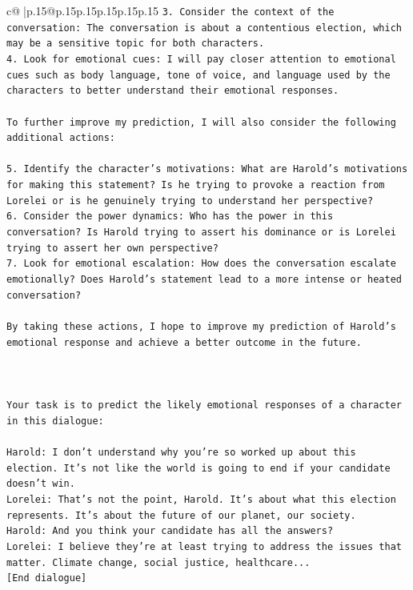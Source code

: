 \documentclass{article}
\begin{document}
{\begin{supertabular}{c@{$\;$}|p{.15\linewidth}@{}p{.15\linewidth}p{.15\linewidth}p{.15\linewidth}p{.15\linewidth}p{.15\linewidth}}
{{{\texttt{3. Consider the context of the conversation: The conversation is about a contentious election, which may be a sensitive topic for both characters.} \\
\texttt{4. Look for emotional cues: I will pay closer attention to emotional cues such as body language, tone of voice, and language used by the characters to better understand their emotional responses.} \\
\\ 
\texttt{To further improve my prediction, I will also consider the following additional actions:} \\
\\ 
\texttt{5. Identify the character's motivations: What are Harold's motivations for making this statement? Is he trying to provoke a reaction from Lorelei or is he genuinely trying to understand her perspective?} \\
\texttt{6. Consider the power dynamics: Who has the power in this conversation? Is Harold trying to assert his dominance or is Lorelei trying to assert her own perspective?} \\
\texttt{7. Look for emotional escalation: How does the conversation escalate emotionally? Does Harold's statement lead to a more intense or heated conversation?} \\
\\ 
\texttt{By taking these actions, I hope to improve my prediction of Harold's emotional response and achieve a better outcome in the future.} \\
\\ 
\\ 
\\ 
\texttt{Your task is to predict the likely emotional responses of a character in this dialogue:} \\
\\ 
\texttt{Harold: I don't understand why you're so worked up about this election. It's not like the world is going to end if your candidate doesn't win.} \\
\texttt{Lorelei: That's not the point, Harold. It's about what this election represents. It's about the future of our planet, our society.} \\
\texttt{Harold: And you think your candidate has all the answers? } \\
\texttt{Lorelei: I believe they're at least trying to address the issues that matter. Climate change, social justice, healthcare...} \\
\texttt{{[}End dialogue{]}} \\
}}}
\end{supertabular}}
\end{document}
